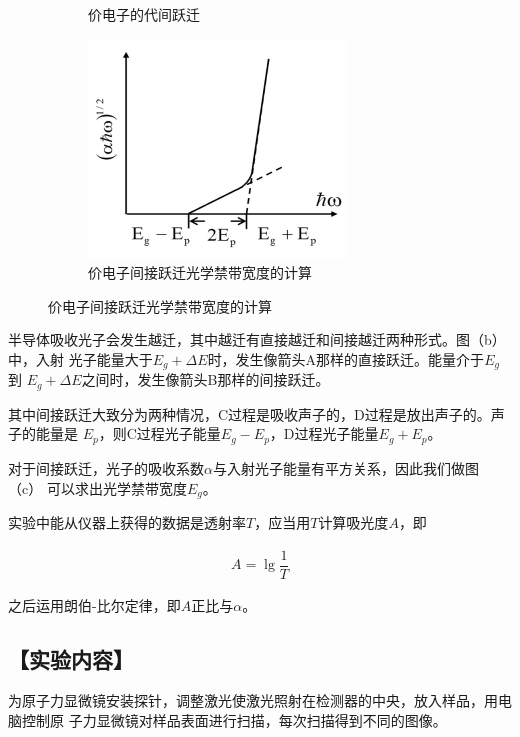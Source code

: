 \documentclass{ctexart}
\let\oldsubsection\subsection
\renewcommand{\subsection}[1]{\oldsubsection{\!\!\!\!\!\!【#1】}}
\begin{document}
\begin{figure}[htbp]
\begin{subfigure}{.35\textwidth}
    \caption{价电子的代间跃迁}
  \end{subfigure}
    \begin{subfigure}{.35\textwidth}
    \centering
    \includegraphics[width=\linewidth]{figures/间接跃迁情况下吸收系数}
    \caption{价电子间接跃迁光学禁带宽度的计算}
  \end{subfigure}
\end{figure}

半导体吸收光子会发生越迁，其中越迁有直接越迁和间接越迁两种形式。图（b）中，入射
光子能量大于$E_g + \Delta E$时，发生像箭头A那样的直接跃迁。能量介于$E_g$到
$E_g + \Delta E$之间时，发生像箭头B那样的间接跃迁。

其中间接跃迁大致分为两种情况，C过程是吸收声子的，D过程是放出声子的。声子的能量是
$E_p$，则C过程光子能量$E_g - E_p$，D过程光子能量$E_g + E_p$。

对于间接跃迁，光子的吸收系数$\alpha$与入射光子能量有平方关系，因此我们做图（c）
可以求出光学禁带宽度$E_g$。

实验中能从仪器上获得的数据是透射率$T$，应当用$T$计算吸光度$A$，即

\begin{equation*}
  \begin{aligned}
    A = \lg \dfrac{1}{T} 
  \end{aligned}
\end{equation*}

之后运用朗伯-比尔定律，即$A$正比与$\alpha$。

\subsection{实验内容}
为原子力显微镜安装探针，调整激光使激光照射在检测器的中央，放入样品，用电脑控制原
子力显微镜对样品表面进行扫描，每次扫描得到不同的图像。
\end{document}
